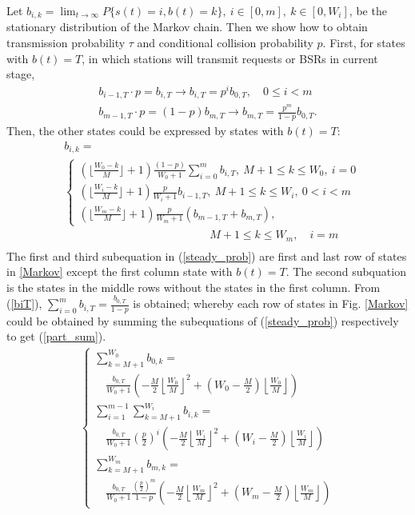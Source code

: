 \documentclass[journal]{IEEEtran}
\begin{document}
Let $b_{i,k} = \lim_{t\rightarrow \infty} P\lbrace s(t) = i, b(t) = k\rbrace,\ i\in [0,m], \ k \in [0,W_i]$, be the stationary distribution of the Markov chain. 
Then we show how to obtain transmission probability $\tau$ and conditional collision probability $p$.
First,  for states with $b(t) = T$, in which stations will transmit requests or BSRs in current stage, 
\begin{align}
b_{i-1,T}\cdot p = b_{i,T} 		\rightarrow b_{i,T} = p^i b_{0,T}, \quad 0\leq i < m \nonumber\\
b_{m-1,T}\cdot p = (1-p) b_{m,T}	\rightarrow b_{m,T} = \frac{p^m}{1-p}b_{0,T}.
\label{biT}
\end{align}
Then, the other states could be expressed by states with $b(t)=T$:
\begin{align}
&b_{i,k} =  \nonumber \\
&
\begin{cases}
(\lfloor \frac{W_0-k}{M} \rfloor+1)\frac{(1-p)}{W_0+1}\sum_{i=0}^m b_{i,T}, \  M+1\leq k\leq W_0,\ i = 0\\[3pt]
(\lfloor \frac{W_i-k}{M} \rfloor+1)\frac{p}{W_i+1}b_{i-1,T}, 				\	 M+1 \leq k\leq W_i, \ 0<i<m \\[3pt]
(\lfloor \frac{W_m-k}{M} \rfloor+1)\frac{p}{W_m+1} (b_{m-1,T}+b_{m,T}), 	
\end{cases}\nonumber
\\ &\qquad \qquad \qquad \qquad \quad \qquad \qquad M+1 \leq k\leq W_m, \quad i = m \nonumber \\
\label{steady_prob}
\end{align}
The first and third subequation in (\ref{steady_prob}) are first and last row of states in \ref{Markov} except the first column state with $b(t)=T$. The second subquation is the states in the middle rows without the states in the first column.
From (\ref{biT}), $\sum_{i=0}^m b_{i,T}= \frac{b_{0,T}}{1-p}$ is obtained; whereby each row of states in Fig. \ref{Markov} could be obtained by summing the subequations of (\ref{steady_prob}) respectively to get (\ref{part_sum}).  
\begin{align}
\begin{cases}
\sum_{k=M+1}^{W_0} b_{0,k} = \\
\quad \frac{b_{0,T}}{W_0+1}\left(-\frac{M}{2}\left\lfloor \frac{W_0}{M}\right\rfloor ^2 + \left(W_0-\frac{M}{2}\right)\left\lfloor \frac{W_0}{M} \right\rfloor \right) \\[8pt]
\sum_{i=1}^{m-1}\sum_{k=M+1}^{W_i} b_{i,k} = \\
\quad \frac{b_{0,T}}{W_0+1}\left(\frac{p}{2}\right)^i \left(-\frac{M}{2}\left\lfloor \frac{W_i}{M}\right\rfloor ^2 + \left(W_i-\frac{M}{2}\right)\left\lfloor \frac{W_i}{M} \right\rfloor \right) \\[8pt]
\sum_{k=M+1}^{W_m} b_{m,k} = \\
\quad \frac{b_{0,T}}{W_0+1}\frac{(\frac{p}{2})^m}{1-p}\left(-\frac{M}{2}\left\lfloor \frac{W_m}{M}\right\rfloor ^2 + \left(W_m-\frac{M}{2}\right)\left\lfloor \frac{W_m}{M} \right\rfloor \right) 
\end{cases}
\label{part_sum}
\end{align}
\end{document}
